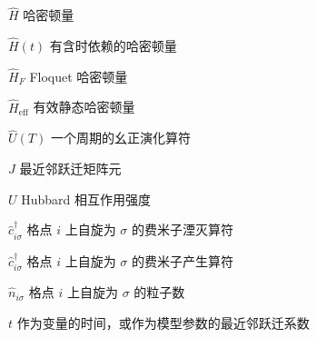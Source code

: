 \begin{denotation}[3cm]
\item[$\hat{H}$] 哈密顿量
\item[$\hat{H}(t)$] 有含时依赖的哈密顿量
\item[$\hat{H}_F$] Floquet 哈密顿量
\item[$\hat{H}_{\text{eff}}$] 有效静态哈密顿量
\item[$\hat{U}(T)$] 一个周期的幺正演化算符
\item[$J$] 最近邻跃迁矩阵元
\item[$U$] Hubbard 相互作用强度
\item[$\hat{c}^{\dagger}_{i\sigma}$] 格点 $i$ 上自旋为 $\sigma$ 的费米子湮灭算符
\item[$\hat{c}^{\dagger}_{i\sigma}$] 格点 $i$ 上自旋为 $\sigma$ 的费米子产生算符
\item[$\hat{n}_{i\sigma}$] 格点 $i$ 上自旋为 $\sigma$ 的粒子数
\item[$t$] 作为变量的时间，或作为模型参数的最近邻跃迁系数
\end{denotation}





